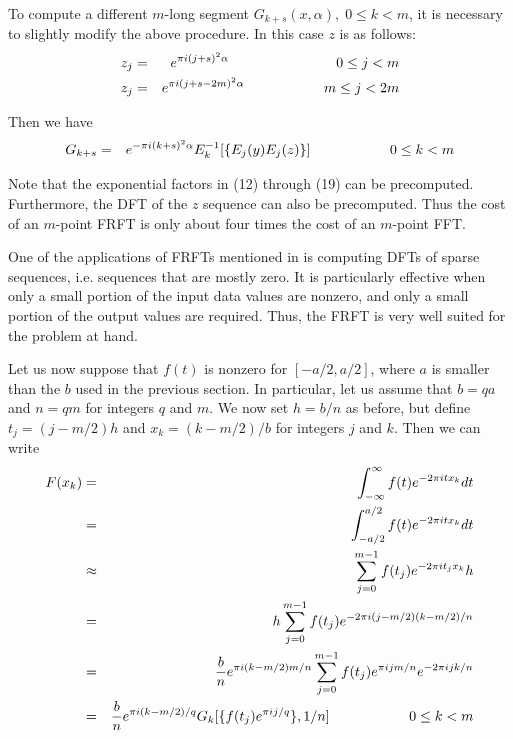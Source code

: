 To compute a different $m$-long segment $G_{k+s} (x, \alpha), \; 0
\leq k < m$, it is necessary to slightly modify the above
procedure.  In this case $z$ is as follows:
\begin{eqnarray}
z_j &=& e^{\pi i (j + s)^2 \alpha}  \hspace{27mm} 0 \leq j < m \\
z_j &=& e^{\pi i (j + s - 2 m)^2 \alpha} \hspace{20mm}
    m \leq j < 2 m
\end{eqnarray}

\noindent
Then we have
\begin{eqnarray}
G_{k+s} &=& e^{- \pi i (k + s)^2 \alpha} E_k^{-1} [\{ E_j (y) E_j (z) \}] 
   \hspace{20mm} 0 \leq k < m
\end{eqnarray}

Note that the exponential factors in (12) through (19) can be
precomputed.  Furthermore, the DFT of the $z$ sequence can also be
precomputed.  Thus the cost of an $m$-point FRFT is only about four
times the cost of an $m$-point FFT.

\vspace{2ex}

One of the applications of FRFTs mentioned in \cite{frft} is computing
DFTs of sparse sequences, i.e. sequences that are mostly zero.  It is
particularly effective when only a small portion of the input data
values are nonzero, and only a small portion of the output values are
required.  Thus, the FRFT is very well suited for the problem at hand.

Let us now suppose that $f(t)$ is nonzero for $[-a / 2, a / 2]$, where
$a$ is smaller than the $b$ used in the previous section.  In
particular, let us assume that $b = q a$ and $n = q m$ for integers
$q$ and $m$.  We now set $h = b / n$ as before, but define $t_j = (j -
m / 2) h$ and $x_k = (k - m / 2)/ b$ for integers $j$ and $k$.  Then
we can write
\begin{eqnarray}
F(x_k) &=& \int _{-\infty} ^\infty f(t) e^{-2 \pi i t x_k} dt \\
     &=& \int _{-a/2} ^{a/2} f(t) e^{-2 \pi i t x_k} dt \\
     &\approx& \sum _{j = 0} ^{m - 1} f(t_j) e^{-2 \pi i t_j x_k} h \\
     &=& h \sum _{j = 0} ^{m - 1} f(t_j) e^{-2 \pi i (j - m / 2) 
       (k - m / 2) / n} \\
     &=& \frac{b}{n} e^{\pi i (k - m / 2) m / n} \sum _{j = 0} ^{m - 1} 
       f(t_j) e^{\pi i j m / n} e^{-2 \pi i j k / n} \\
     &=& \frac{b}{n} e^{\pi i (k - m / 2) / q} G_k [\{f(t_j) 
       e^{\pi i j / q} \}, 1 / n] \hspace{20mm} 0 \leq k < m
\end{eqnarray}

